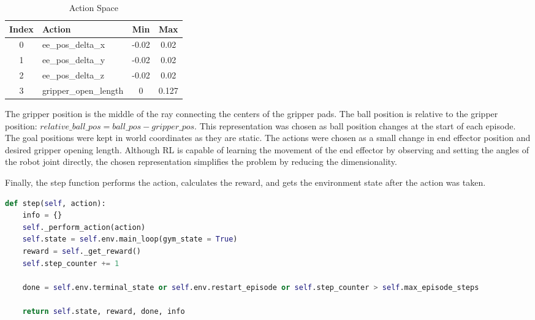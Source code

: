   \begin{table}[ht]
    \setlength{\abovecaptionskip}{6pt}
    \centering
    \begin{tabular}{|c|l|c|c|}
    \hline
    \textbf{Index} & \textbf{Action}                  & \textbf{Min} & \textbf{Max} \\ \hline
    0              & ee\_pos\_delta\_x               & -0.02        & 0.02         \\ \hline
    1              & ee\_pos\_delta\_y               & -0.02        & 0.02         \\ \hline
    2              & ee\_pos\_delta\_z               & -0.02        & 0.02         \\ \hline
    3              & gripper\_open\_length           & 0            & 0.127        \\ \hline
    \end{tabular}
    \caption{Action Space}
    \end{table}

\bigskip \noindent
The gripper position is the middle of the ray connecting the centers of the gripper pads. The ball position is relative to the gripper position: $relative\_ball\_pos = ball\_pos - gripper\_pos$. This representation was chosen as ball position changes at the start of each episode. The goal positions were kept in world coordinates as they are static. The actions were chosen as a small change in end effector position and desired gripper opening length. Although RL is capable of learning the movement of the end effector by observing and setting the angles of the robot joint directly, the chosen representation simplifies the problem by reducing the dimensionality.
    
\bigskip \noindent
Finally, the step function performs the action, calculates the reward, and gets the environment state after the action was taken.

\begin{lstlisting}[language=Python, caption=Gym Wrapper Step Function, breaklines=true]
def step(self, action):
    info = {}
    self._perform_action(action)
    self.state = self.env.main_loop(gym_state = True)
    reward = self._get_reward()
    self.step_counter += 1
    
    done = self.env.terminal_state or self.env.restart_episode or self.step_counter > self.max_episode_steps
    
    return self.state, reward, done, info 
\end{lstlisting}

